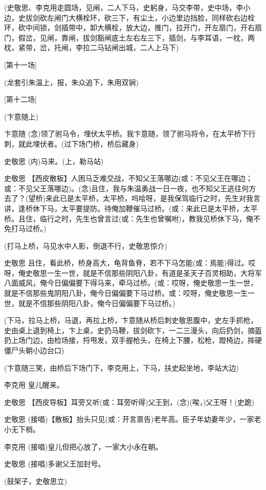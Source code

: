 (史敬思、李克用走圆场，见闸，二人下马，史躬身，马交李带，史中场，李小边，史拔剑砍左闸门大横栓环，砍三下，有尘土，小边里边挡脸，同样砍右边栓环，砍中间锁，剑插带中，卸大横栓，放大边，推门，拉开门，开左扇门，开右扇门，假岔，见闸，靠闸，拔剑豁闸底土左右左三下，插剑，与李耳语，一枕，两枕，紧带，岔，托闸，李拉二马钻闸出城，二人上马下)

{[}第十一场{]}

(龙套引朱温上，报，朱众追下，朱用双锏)

{[}第十二场{]}

(卞意随上)

卞意随
(念)领了驸马令，埋伏太平桥。我卞意随，领了驸马将令，在太平桥下行刺，就此埋伏者。(过下场门桥，桥后藏身)

史敬思 (内)马来。(上，勒马站)

史敬思
【西皮散板】人困马乏难交战，不知父王落哪边(或：不见父王在哪边；或：不见父王落哪边)。(念)且住，我与朱温勇战一日一夜，也不知父王逃往何方去了？(望桥)来此已是太平桥，太平桥，呜哙呀，是我保驾临行之时，先生对我言讲，逢桥休下马，太平要提防。待俺加鞭催马过桥。(或：来此已是太平桥，太平桥。且住，临行之时，先生也曾言过(或：先生也曾嘱咐)，教我见桥休下马，俺不免打马过桥。)

(打马上桥，马见水中人影，倒退不行，史敬思惊介)

史敬思
且住，看此桥，桥身高大，龟背鱼脊，若不下马怎能(或：焉能)得过。哎呀，俺史敬思一生一世，就是不信那些阴阳八卦，有道是圣天子百灵相助，大将军八面威风，俺今日偏偏要下得马来，牵马过桥。(或：哎呀，俺史敬思一生一世，就是不信那些鬼阴阳八卦，俺今日偏偏要下马过桥。或：哎呀，俺史敬思一生一世，就是不信那些阴阳八卦，俺今日偏偏要下马过桥。)

(下马，拉马上桥，马退，再拉上桥，卞意随从桥后刺史敬思腹中，史左手抓枪，史由桌上退到椅上，卞上桌，史扔马鞭，拔剑砍卞，一二三漫头，向后扔剑，摘盔扔上场门边，由检场接，捋甩发，双手握枪头，在椅上下腰，松枪，蹬椅边，摔硬僵尸头朝小边台口)

(卞意随三笑，由桥后下场门下，李克用上，下马，扶史起坐地，李站大边)

李克用 皇儿醒来。

史敬思
【西皮导板】耳旁又听(或：耳旁听得)父王到，(念)(唉，)父王呀！(史跪)

史敬思
(接唱)【散板】抬头只见(或：开言禀告)老年高。臣子年幼妻年少，一家老小无下梢。

李克用 (接唱)皇儿但把心放了，一家大小永在朝。

史敬思 (接唱)多谢父王加封号。

(鼓架子，史敬思立)

